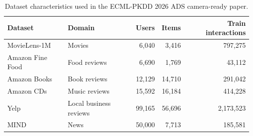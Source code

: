 \begin{table}[t]
  \centering
  \caption{Dataset characteristics used in the ECML-PKDD 2026 ADS camera-ready paper.}
  \label{tab:dataset-characteristics}
  \begin{tabular}{llrrr}
    \toprule
    \textbf{Dataset} & \textbf{Domain} & \textbf{Users} & \textbf{Items} & \textbf{Train interactions} \\
    \midrule
    MovieLens-1M & Movies & 6,040 & 3,416 & 797,275 \\
    Amazon Fine Food & Food reviews & 6,690 & 1,769 & 43,112 \\
    Amazon Books & Book reviews & 12,129 & 14,710 & 291,042 \\
    Amazon CDs & Music reviews & 15,592 & 16,184 & 414,228 \\
    Yelp & Local business reviews & 99,165 & 56,696 & 2,173,523 \\
    MIND & News & 50,000 & 7,713 & 185,581 \\
    \bottomrule
  \end{tabular}
\end{table}
